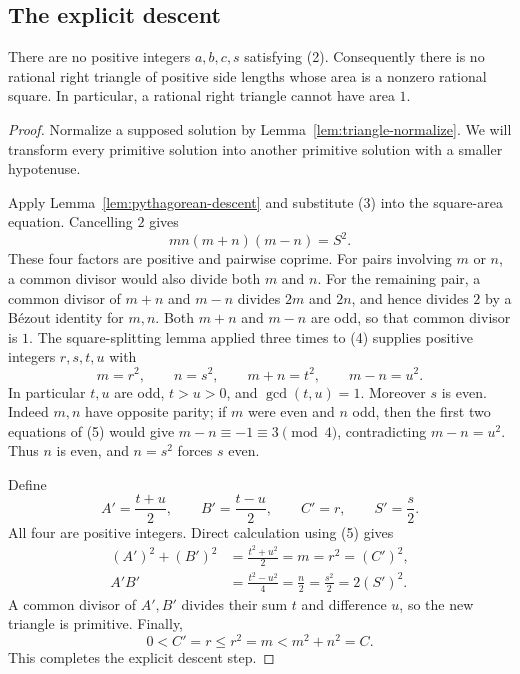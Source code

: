 \subsection{The explicit descent}

\begin{theorem}\label{thm:fermat-area}
There are no positive integers $a,b,c,s$ satisfying (2).  Consequently there
is no rational right triangle of positive side lengths whose area is a
nonzero rational square.  In particular, a rational right triangle cannot
have area $1$.
\end{theorem}

\begin{proof}
Normalize a supposed solution by Lemma~\ref{lem:triangle-normalize}.  We
will transform every primitive solution into another primitive solution
with a smaller hypotenuse.

Apply Lemma~\ref{lem:pythagorean-descent} and substitute (3) into the
square-area equation.  Cancelling $2$ gives
\[
 m n(m+n)(m-n)=S^2.                         \tag{4}
\]
These four factors are positive and pairwise coprime.  For pairs involving
$m$ or $n$, a common divisor would also divide both $m$ and $n$.
For the remaining pair, a common divisor of $m+n$ and $m-n$ divides
$2m$ and $2n$, and hence divides $2$ by a B\'ezout identity for $m,n$.
Both $m+n$ and $m-n$ are odd, so that common divisor is $1$.
The square-splitting lemma applied three times to (4) supplies positive
integers $r,s,t,u$ with
\[
 m=r^2,\qquad n=s^2,\qquad m+n=t^2,\qquad m-n=u^2.
 \tag{5}
\]
In particular $t,u$ are odd, $t>u>0$, and $\gcd(t,u)=1$.
Moreover $s$ is even.  Indeed $m,n$ have opposite parity; if $m$ were even
and $n$ odd, then the first two equations of (5) would give
$m-n\equiv-1\equiv3\pmod4$, contradicting $m-n=u^2$.
Thus $n$ is even, and $n=s^2$ forces $s$ even.

Define
\[
 A'=\frac{t+u}{2},\qquad B'=\frac{t-u}{2},\qquad
 C'=r,\qquad S'=\frac s2.                  \tag{6}
\]
All four are positive integers.  Direct calculation using (5) gives
\begin{align*}
 (A')^2+(B')^2
   &=\frac{t^2+u^2}{2}=m=r^2=(C')^2,\\
 A'B'&=\frac{t^2-u^2}{4}=\frac n2
       =\frac{s^2}{2}=2(S')^2.
\end{align*}
A common divisor of $A',B'$ divides their sum $t$ and difference $u$,
so the new triangle is primitive.  Finally,
\[
 0<C'=r\leq r^2=m<m^2+n^2=C.
 \tag{7}
\]
This completes the explicit descent step.


\end{proof}
